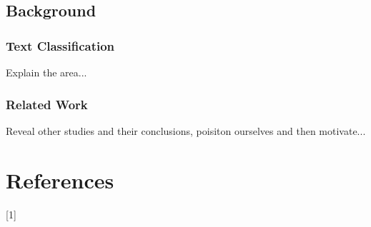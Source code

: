 \documentclass{article}
\begin{document}
\subsection{Background}

\subsubsection{Text Classification}
Explain the area...

\subsubsection{Related Work}
Reveal other studies and their conclusions,
poisiton ourselves and then motivate...

\section{References}

 [1]
\end{document}
